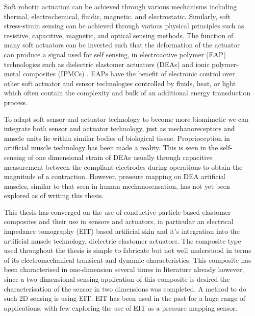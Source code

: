 Soft robotic actuation can be achieved through various mechanisms including thermal, electrochemical, fluidic, magnetic, and electrostatic. Similarly, soft stress-strain sensing can be achieved through various physical principles such as resistive, capacitive, magnetic, and optical sensing methods. The function of many soft actuators can be inverted such that the deformation of the actuator can produce a signal used for self sensing, in electroactive polymer (EAP) technologies such as dielectric elastomer actuators (DEAs) \cite{Gisby2013, Rosset2013, Liu2016, Huang2023} and ionic polymer-metal composites (IPMCs) \cite{MohdIsa2019}. EAPs have the benefit of electronic control over other soft actuator and sensor technologies controlled by fluids, heat, or light which often contain the complexity and bulk of an additional energy transduction process.

To adapt soft sensor and actuator technology to become more biomimetic we can integrate both sensor and actuator technology, just as mechanoreceptors and muscle units lie within similar bodies of biological tissue. Proprioception in artificial muscle technology has been made a reality. This is seen in the self-sensing of one dimensional strain of DEAs usually through capacitive measurement between the compliant electrodes during operations to obtain the magnitude of a contraction. However, pressure mapping on DEA artificial muscles, similar to that seen in human mechanosensation, has not yet been explored as of writing this thesis.

This thesis has converged on the use of conductive particle based elastomer composites and their use in sensors and actuators, in particular an electrical impedance tomography (EIT) based artificial skin and it's integration into the artificial muscle technology, dielectric elastomer actuators. The composite type used throughout the thesis is simple to fabricate but not well understood in terms of its electromechanical transient and dynamic characteristics. This composite has been characterised in one-dimension several times in literature already however, since a two dimensional sensing application of this composite is desired the characterisation of the sensor in two dimensions was completed. A method to do such 2D sensing is using EIT. EIT has been used in the past for a huge range of applications, with few exploring the use of EIT as a pressure mapping sensor. 


